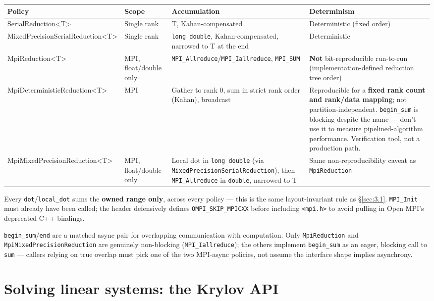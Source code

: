 \documentclass[11pt,a4paper]{report}
\newcommand{\secref}[1]{\S\ref{#1}}
\begin{document}
\begin{longtable}{L{0.20\textwidth}P{0.13\textwidth}P{0.24\textwidth}P{0.30\textwidth}}
\toprule
Policy & Scope & Accumulation & Determinism \\
\midrule
\endhead
SerialReduction<T> & Single rank & T, Kahan-compensated & Deterministic (fixed order) \\
MixedPrecisionSerialReduction<T> & Single rank & \texttt{long double}, Kahan-compensated, narrowed to T at the end & Deterministic \\
MpiReduction<T> & MPI, float/double only & \lstinline!MPI_Allreduce!/\lstinline!MPI_Iallreduce!, \lstinline!MPI_SUM! & \textbf{Not} bit-reproducible run-to-run (implementation-defined reduction tree order) \\
MpiDeterministicReduction<T> & MPI & Gather to rank 0, sum in strict rank order (Kahan), broadcast & Reproducible for a \textbf{fixed rank count and rank/data mapping}; not partition-independent. \lstinline!begin_sum! is blocking despite the name --- don't use it to measure pipelined-algorithm performance. Verification tool, not a production path. \\
MpiMixedPrecisionReduction<T> & MPI, float/double only & Local dot in \texttt{long double} (via \lstinline!MixedPrecisionSerialReduction!), then \lstinline!MPI_Allreduce! in \texttt{double}, narrowed to T & Same non-reproducibility caveat as \lstinline!MpiReduction! \\
\bottomrule
\end{longtable}

Every \lstinline!dot!/\lstinline!local_dot! sums the \textbf{owned range only}, across
every policy --- this is the same layout-invariant rule as
\secref{sec:3.1}. \lstinline!MPI_Init! must already have been called; the
header defensively defines \lstinline!OMPI_SKIP_MPICXX! before including
\lstinline!<mpi.h>! to avoid pulling in Open MPI's deprecated C++ bindings.

\lstinline!begin_sum!/\lstinline!end! are a matched async pair for overlapping
communication with computation. Only \lstinline!MpiReduction! and
\lstinline!MpiMixedPrecisionReduction! are genuinely non-blocking
(\lstinline!MPI_Iallreduce!); the others implement \lstinline!begin_sum! as an eager,
blocking call to \lstinline!sum! --- callers relying on true overlap must pick
one of the two MPI-async policies, not assume the interface shape
implies asynchrony.

\chapter{Solving linear systems: the Krylov API}
\label{sec:5}
\end{document}
